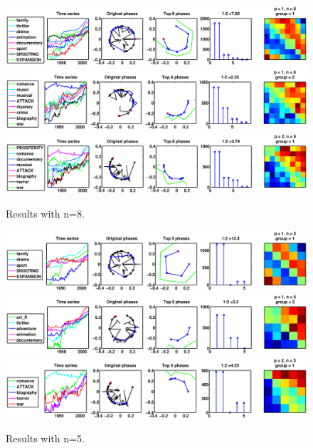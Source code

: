 \documentclass[11pt]{article}
\begin{document}
\begin{figure}[H]
\includegraphics[trim = 0 0 130 0, clip, width=\textwidth]{pictures/_p1_n8_gp1.eps}
\includegraphics[trim = 0 0 130 0, clip, width=\textwidth]{pictures/_p1_n8_gp2.eps}
\includegraphics[trim = 0 0 130 0, clip, width=\textwidth]{pictures/_p2_n8_gp1.eps}
\caption{Results with n=8.}
\end{figure}

\begin{figure}[H]
\includegraphics[trim = 0 0 130 0, clip, width=\textwidth]{pictures/_p1_n5_gp1.eps}
\includegraphics[trim = 0 0 130 0, clip, width=\textwidth]{pictures/_p1_n5_gp2.eps}
\includegraphics[trim = 0 0 130 0, clip, width=\textwidth]{pictures/_p2_n5_gp1.eps}
\caption{Results with n=5.}
\end{figure}
\end{document}
